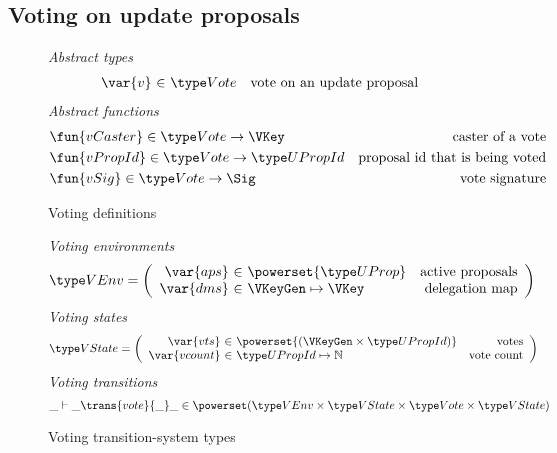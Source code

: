 \clearpage

\subsection{Voting on update proposals}
\label{sec:voting-on-update-proposals}

\begin{figure}[htb]
  \emph{Abstract types}
  \begin{equation*}
    \begin{array}{r@{~\in~}lr}
      \var{v} & \Vote & \text{vote on an update proposal}
    \end{array}
  \end{equation*}
  \emph{Abstract functions}
  \begin{align*}
    & \fun{vCaster} \in \Vote \to \VKey & \text{caster of a vote}\\
    & \fun{vPropId} \in \Vote \to \UPropId & \text{proposal id that is being voted}\\
    & \fun{vSig} \in \Vote \to \Sig & \text{vote signature}
  \end{align*}
  \caption{Voting definitions}
  \label{fig:defs:voting}
\end{figure}

\begin{figure}[htb]
  \emph{Voting environments}
  \begin{align*}
    & \VEnv
      = \left(
      \begin{array}{r@{~\in~}lr}
        \var{aps} & \powerset{\UProp} & \text{active proposals}\\
        \var{dms} & \VKeyGen \mapsto \VKey & \text{delegation map}
      \end{array}\right)
  \end{align*}
  \emph{Voting states}
  \begin{align*}
    & \VState
      = \left(
      \begin{array}{r@{~\in~}lr}
        \var{vts} & \powerset{(\VKeyGen \times \UPropId)} & \text{votes}\\
        \var{vcount} & \UPropId \mapsto \mathbb{N} & \text{vote count}
      \end{array}\right)
  \end{align*}
  \emph{Voting transitions}
    \begin{equation*}
    \_ \vdash \_ \trans{vote}{\_} \_ \in
    \powerset (\VEnv \times \VState \times \Vote \times \VState)
    \end{equation*}
  \caption{Voting transition-system types}
  \label{fig:ts-types:voting}
\end{figure}

